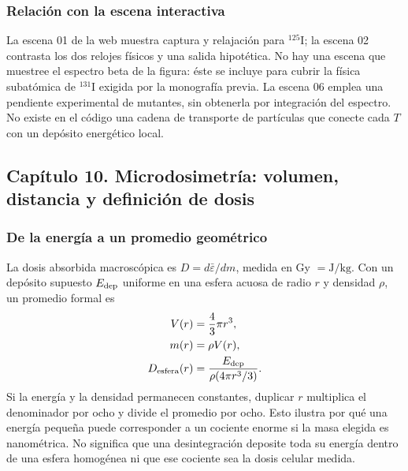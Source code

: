 \subsubsection{Relación con la escena interactiva}
La escena 01 de la web muestra captura y relajación para $^{125}$I; la escena
02 contrasta los dos relojes físicos y una salida hipotética. No hay una
escena que muestree el espectro beta de la figura: éste se incluye para
cubrir la física subatómica de $^{131}$I exigida por la monografía previa.
La escena 06 emplea una pendiente experimental de mutantes, sin obtenerla
por integración del espectro. No existe en el código una cadena de transporte
de partículas que conecte cada $T$ con un depósito energético local.

\clearpage
\subsection{Capítulo 10. Microdosimetría: volumen, distancia y definición de dosis}
\label{ampliacion-micro}

\subsubsection{De la energía a un promedio geométrico}
La dosis absorbida macroscópica es $D=d\bar\varepsilon/dm$, medida en
Gy $=\mathrm{J}/\mathrm{kg}$. Con un depósito supuesto $E_{\rm dep}$ uniforme
en una esfera acuosa de radio $r$ y densidad $\rho$, un promedio formal es
\begin{align}
V(r)&=\frac43\pi r^3,\\
m(r)&=\rho V(r),\\
D_{\rm esfera}(r)&=\frac{E_{\rm dep}}{\rho(4\pi r^3/3)}.
\end{align}
Si la energía y la densidad permanecen constantes, duplicar $r$ multiplica
el denominador por ocho y divide el promedio por ocho. Esto ilustra por qué
una energía pequeña puede corresponder a un cociente enorme si la masa
elegida es nanométrica. No significa que una desintegración deposite toda
su energía dentro de una esfera homogénea ni que ese cociente sea la dosis
celular medida.


